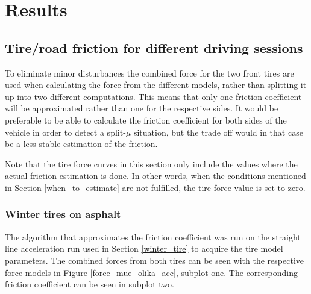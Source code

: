 \chapter{Results}
\label{chapter_five}

\section{Tire/road friction for different driving sessions}


To eliminate minor disturbances the combined force for the two front tires are used when calculating the force from the different models, rather than splitting it up into two different computations. This means that only one friction coefficient will be approximated rather than one for the respective sides. It would be preferable to be able to calculate the friction coefficient for both sides of the vehicle in order to detect a split-$ \mu $ situation, but the trade off would in that case be a less stable estimation of the friction.

Note that the tire force curves in this section only include the values where the actual friction estimation is done. In other words, when the conditions mentioned in Section \ref{when_to_estimate} are not fulfilled, the tire force value is set to zero. 


\subsection{Winter tires on asphalt}
The algorithm that approximates the friction coefficient was run on the straight line acceleration run used in Section \ref{winter_tire} to acquire the tire model parameters. The combined forces from both tires can be seen with the respective force models in Figure \ref{force_mue_olika_acc}, subplot one. The corresponding friction coefficient can be seen in subplot two. 

